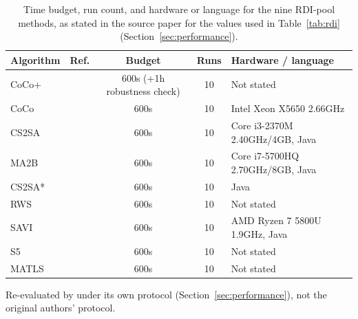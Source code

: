 \begin{table}[htbp]
\centering
\footnotesize
\caption{Time budget, run count, and hardware or language for the nine RDI-pool methods, as stated in the source paper for the values used in Table~\ref{tab:rdi} (Section~\ref{sec:performance}).}
\label{tab:budget}
\begin{threeparttable}
\begin{tabular}{@{}llccl@{}}
\toprule
\textbf{Algorithm} & \textbf{Ref.} & \textbf{Budget} & \textbf{Runs} & \textbf{Hardware / language} \\
\midrule
CoCo+ & \citet{namazi2023solving} & 600s (+1h robustness check) & 10 & Not stated \\
CoCo & \citet{namazi2019cooperative} & 600s & 10 & Intel Xeon X5650 2.66GHz \\
CS2SA & \citet{el2016population} & 600s & 10 & Core i3-2370M 2.40GHz/4GB, Java \\
MA2B & \citet{el2016population} & 600s & 10 & Core i7-5700HQ 2.70GHz/8GB, Java \\
CS2SA* & \citet{el2018efficiently} & 600s & 10 & Java \\
RWS & \citet{zhang2021solving} & 600s & 10 & Not stated \\
SAVI & \citet{nguyen2023simulated} & 600s & 10 & AMD Ryzen 7 5800U 1.9GHz, Java \\
S5 & \citet{faulkner2015approximate}\tnote{a} & 600s & 10 & Not stated \\
MATLS & \citet{mei2014improving}\tnote{a} & 600s & 10 & Not stated \\
\bottomrule
\end{tabular}
\begin{tablenotes}
\footnotesize
\item[a] Re-evaluated by \citet{zhang2021solving} under its own protocol (Section~\ref{sec:performance}), not the original authors' protocol.
\end{tablenotes}
\end{threeparttable}
\end{table}
